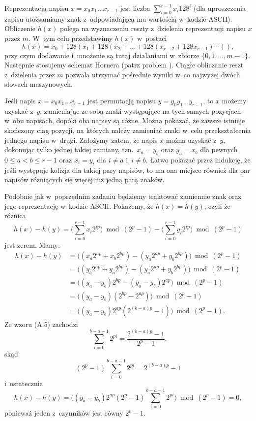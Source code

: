 \exercise %
Reprezentacją napisu $x=x_0x_1\dots x_{r-1}$ jest liczba $\sum_{i=0}^{r-1}x_i128^i$ (dla uproszczenia zapisu utożsamiamy znak z~odpowiadającą mu wartością w~kodzie ASCII).
Obliczenie $h(x)$ polega na wyznaczeniu reszty z~dzielenia reprezentacji napisu $x$ przez $m$.
W~tym celu przedstawimy $h(x)$ w~postaci
\[
	h(x) = x_0+128(x_1+128(x_2+\dots+128(x_{r-2}+128x_{r-1})\cdots)),
\]
przy czym dodawanie i~mnożenie są tutaj działaniami w~zbiorze $\{0,1,\dots,m-1\}$.
Następnie stosujemy schemat Hornera (patrz problem ).
Ciągłe obliczanie reszt z~dzielenia przez $m$ pozwala utrzymać pośrednie wyniki w~co najwyżej dwóch słowach maszynowych.

\exercise %
Jeśli napis $x=x_0x_1\dots x_{r-1}$ jest permutacją napisu $y=y_0y_1\dots y_{r-1}$, to $x$ możemy uzyskać z~$y$, zamieniając ze sobą znaki występujące na tych samych pozycjach w~obu napisach, dopóki oba napisy są różne.
Można pokazać, że zawsze istnieje skończony ciąg pozycji, na których należy zamieniać znaki w~celu przekształcenia jednego napisu w~drugi.
Założymy zatem, że napis $x$ można uzyskać z~$y$, dokonując tylko jednej takiej zamiany, tzn.\ $x_a=y_b$ oraz $y_a=x_b$ dla pewnych $0\le a<b\le r-1$ oraz $x_i=y_i$ dla $i\ne a$ i~$i\ne b$.
Łatwo pokazać przez indukcję, że jeśli występuje kolizja dla takiej pary napisów, to ma ona miejsce również dla par napisów różniących się więcej niż jedną parą znaków.

Podobnie jak w~poprzednim zadaniu będziemy traktować zamiennie znak oraz jego reprezentację w~kodzie ASCII\@.
Pokażemy, że $h(x)=h(y)$, czyli że różnica
\[
	h(x)-h(y) = \biggl(\sum_{i=0}^{r-1}x_i2^{ip}\biggr)\bmod(2^p-1)-\biggl(\sum_{i=0}^{r-1}y_i2^{ip}\biggr)\bmod(2^p-1)
\]
jest zerem.
Mamy:
\begin{align*}
	h(x)-h(y) &= \bigl((x_a2^{ap}+x_b2^{bp})-(y_a2^{ap}+y_b2^{bp})\bigr)\bmod(2^p-1) \\
	&= \bigl((y_b2^{ap}+y_a2^{bp})-(y_a2^{ap}+y_b2^{bp})\bigr)\bmod(2^p-1) \\
	&= \bigl((y_a-y_b)2^{bp}-(y_a-y_b)2^{ap}\bigr)\bmod(2^p-1) \\
	&= \bigl((y_a-y_b)(2^{bp}-2^{ap})\bigr)\bmod(2^p-1) \\
	&= \bigl((y_a-y_b)2^{ap}(2^{(b-a)p}-1)\bigr)\bmod(2^p-1).
\end{align*}
Ze wzoru (A.5) zachodzi
\[
	\sum_{i=0}^{b-a-1}2^{pi} = \frac{2^{(b-a)p}-1}{2^p-1},
\]
skąd
\[
	(2^p-1)\sum_{i=0}^{b-a-1}2^{pi} = 2^{(b-a)p}-1
\]
i~ostatecznie
\[
	h(x)-h(y) = \biggl((y_a-y_b)2^{ap}(2^p-1)\sum_{i=0}^{b-a-1}2^{pi}\biggr)\bmod(2^p-1) = 0,
\]
ponieważ jeden z~czynników jest równy $2^p-1$.


